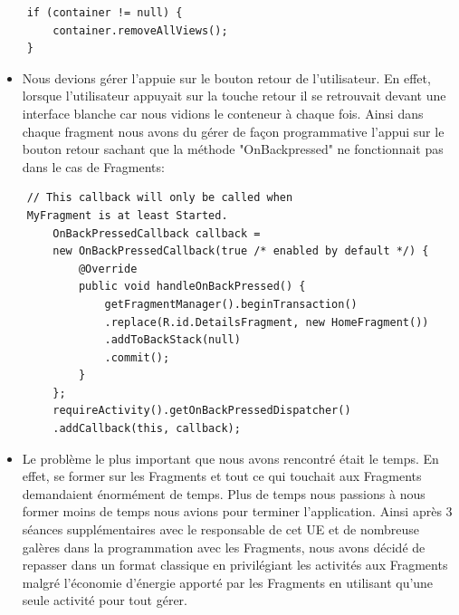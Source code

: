 \documentclass[12pt,a4paper]{report}
\begin{document}
\begin{flushleft}
\begin{itemize}
\end{itemize}
\begin{lstlisting}
	if (container != null) {
		container.removeAllViews();
	}
\end{lstlisting}
\begin{itemize}
\item Nous devions gérer l'appuie sur le bouton retour de l'utilisateur. En effet, lorsque l'utilisateur appuyait sur la touche retour il se retrouvait devant une interface blanche car nous vidions le conteneur à chaque fois. Ainsi dans chaque fragment nous avons du gérer de façon programmative l'appui sur le bouton retour sachant que la méthode "OnBackpressed" ne fonctionnait pas dans le cas de Fragments:
\end{itemize}
\begin{lstlisting}
	// This callback will only be called when 
	MyFragment is at least Started.
        OnBackPressedCallback callback = 
        new OnBackPressedCallback(true /* enabled by default */) {
            @Override
            public void handleOnBackPressed() {
                getFragmentManager().beginTransaction()
                .replace(R.id.DetailsFragment, new HomeFragment())
                .addToBackStack(null)
                .commit();
            }
        };
        requireActivity().getOnBackPressedDispatcher()
        .addCallback(this, callback);
\end{lstlisting}
\begin{itemize}
\item Le problème le plus important que nous avons rencontré était le temps. En effet, se former sur les Fragments et tout ce qui touchait aux Fragments demandaient énormément de temps. Plus de temps nous passions à nous former moins de temps nous avions pour terminer l'application. Ainsi après 3 séances supplémentaires avec le responsable de cet UE et de nombreuse galères dans la programmation avec les Fragments, nous avons décidé de repasser dans un format classique en privilégiant les activités aux Fragments malgré l'économie d'énergie apporté par les Fragments en utilisant qu'une seule activité pour tout gérer.
\end{itemize}
\end{flushleft}
\end{document}
